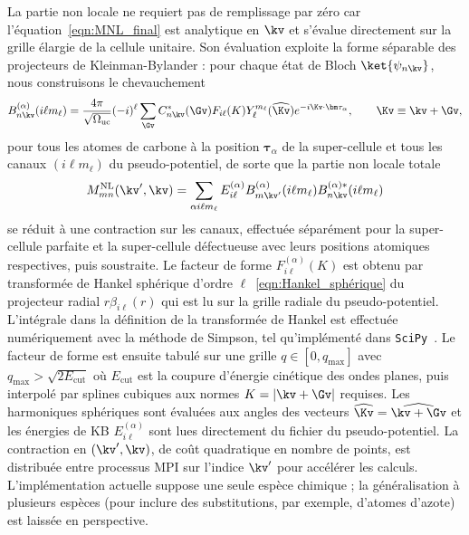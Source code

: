La partie non locale ne requiert pas de remplissage par zéro car l'équation~\eqref{eqn:MNL_final} est analytique en $\kv$ et s'évalue directement sur la grille élargie de la cellule unitaire. Son évaluation exploite la forme séparable des projecteurs de Kleinman-Bylander : pour chaque état de Bloch $\ket{\psi_{n\kv}}$, nous construisons le chevauchement
\begin{equation}
    B_{n\kv}^{(\alpha)}(i\ell m_\ell) = \frac{4\pi}{\sqrt{\Omega_\text{uc}}}(-i)^\ell\sum_{\Gv}C^*_{n\kv} (\Gv) F_{i\ell}(K)Y_\ell^{m_\ell}(\widehat{\Kv})e^{-i\Kv\cdot\bm\tau_\alpha},\qquad \Kv\equiv \kv+\Gv,
\end{equation}
pour tous les atomes de carbone à la position $\bm\tau_\alpha$ de la super-cellule et tous les canaux $(i\ell m_\ell)$ du pseudo-potentiel, de sorte que la partie non locale totale
\begin{equation}
M^\text{NL}_{mn}(\kv',\kv)=\sum_{\alpha i\ell m_\ell}E_{i\ell}^{(\alpha)}B_{m\kv'}^{(\alpha)}(i\ell m_\ell) B^{(\alpha)*}_{n\kv}(i\ell m_\ell)
\end{equation}
se réduit à une contraction sur les canaux, effectuée séparément pour la super-cellule parfaite et la super-cellule défectueuse avec leurs positions atomiques respectives, puis soustraite. Le facteur de forme $F_{i\ell}^{(\alpha)}(K)$ est obtenu par transformée de Hankel sphérique d'ordre $\ell$~\eqref{eqn:Hankel_sphérique} du projecteur radial $r\beta_{i\ell}(r)$ qui est lu sur la grille radiale du pseudo-potentiel. L'intégrale dans la définition de la transformée de Hankel est effectuée numériquement avec la méthode de Simpson, tel qu'implémenté dans \texttt{SciPy}~\cite{virtanenSciPy10Fundamental2020}. Le facteur de forme est ensuite tabulé sur une grille $q\in[0,q_\text{max}]$ avec $q_\text{max}>\sqrt{2E_\text{cut}}$ où $E_\text{cut}$ est la coupure d'énergie cinétique des ondes planes, puis interpolé par splines cubiques aux normes $K=|\kv+\Gv|$ requises. Les harmoniques sphériques sont évaluées aux angles des vecteurs $\widehat{\Kv} =\widehat{\kv+\Gv}$ et les énergies de KB $E_{i\ell}^{(\alpha)}$ sont lues directement du fichier du pseudo-potentiel. La contraction en $(\kv',\kv)$, de coût quadratique en nombre de points, est distribuée entre processus MPI sur l'indice $\kv'$ pour accélérer les calculs. L'implémentation actuelle suppose une seule espèce chimique ; la généralisation à plusieurs espèces (pour inclure des substitutions, par exemple, d'atomes d'azote) est laissée en perspective.



